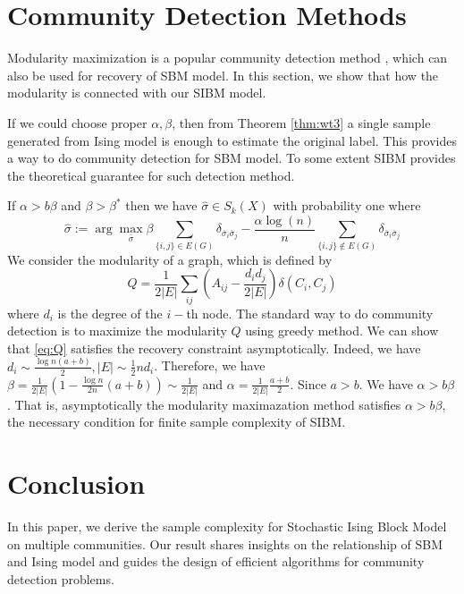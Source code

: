 \documentclass[conference]{IEEEtran}
\newcommand{\ide}[2]{ \delta_{#1 #2} }
\begin{document}
	\section{Community Detection Methods}\label{s:cdm}
	Modularity maximization is a popular community detection method \cite{clauset2004finding}, which can also be used for recovery of SBM model.
	In this section,
	we show that how the modularity is connected with our SIBM model.
	
	If we could choose proper $\alpha, \beta$, then from Theorem \ref{thm:wt3} a single sample generated from Ising model is enough to
	estimate the original label. This provides a way to do community detection for SBM model.
	To some extent
	SIBM provides the theoretical guarantee for such detection method.
	
	If $\alpha > b \beta$ and $\beta > \beta^*$ then we have $\hat{\sigma} \in S_k(X)$ with probability
	one where
	\begin{equation}\label{eq:hat_sigma}
	\hat{\sigma} := \arg\max_{\bar{\sigma}}\beta \sum_{\{i,j\}\in E(G)} \ide{\bar{\sigma}_i}{\bar{\sigma}_j}
	-\frac{\alpha\log(n)}{n} \sum_{\{i,j\}\notin E(G)} \ide{\bar{\sigma}_i}{\bar{\sigma}_j} 
	\end{equation}
	We consider the modularity of a graph, which is defined by
	\begin{equation}\label{eq:Q}
	Q = \frac{1}{2 |E|} \sum_{ij} (A_{ij} - \frac{d_i d_j}{2 |E|}) \delta(C_i, C_j)
	\end{equation}
	where $d_i$ is the degree of the $i-$th node.
	The standard way to do community detection is to maximize the modularity $Q$ using greedy method.
	We can show that \eqref{eq:Q} satisfies the recovery constraint asymptotically.
	Indeed, we have $d_i \sim \frac{\log n(a+b)}{2}, |E| \sim \frac{1}{2}n d_i$. Therefore, we have $\beta = \frac{1}{2|E|}(1-\frac{\log n}{2n}(a+b))
	\sim \frac{1}{2|E|}$
	and $\alpha = \frac{1}{2|E|}\frac{a+b}{2}$. Since $a>b$. We have $\alpha > b \beta$. That is, asymptotically the modularity maximazation method
	satisfies $\alpha > b\beta$, the necessary condition for finite sample complexity of SIBM.
	
	\section{Conclusion}\label{s:conclusion}
	In this paper, we derive the sample complexity for Stochastic Ising Block Model on multiple communities.
	Our result shares insights on the relationship of SBM and Ising model and guides the design of efficient algorithms
	for community detection problems.
\end{document}

